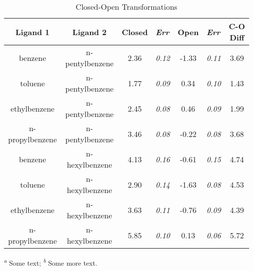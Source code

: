 \documentclass[T4paper.tex]{subfiles}
\begin{document}
\begin{table}[!htb]
\centering
\caption{Closed-Open Transformations}
\label{tbl:C-O}
\begin{tabular}{|c|c|c|l|c|l|c|}
\hline
\textbf{Ligand 1}                       & \textbf{Ligand 2}                       & {\color[HTML]{800080} \textbf{Closed}} & {\color[HTML]{800080} \textit{Err}} & {\color[HTML]{008000} \textbf{Open}} & {\color[HTML]{008000} \textit{Err}} & \textbf{C-O Diff}            \\ \hline
\cellcolor[HTML]{800080}benzene         & \cellcolor[HTML]{008000}n-pentylbenzene & 2.36                                   & \textit{0.12}                       & -1.33                                & \textit{0.11}                       & \cellcolor[HTML]{FFCCC9}3.69 \\ \hline
\cellcolor[HTML]{800080}toluene         & \cellcolor[HTML]{008000}n-pentylbenzene & 1.77                                   & \textit{0.09}                       & 0.34                                 & \textit{0.10}                       & \cellcolor[HTML]{FFCCC9}1.43 \\ \hline
\cellcolor[HTML]{800080}ethylbenzene    & \cellcolor[HTML]{008000}n-pentylbenzene & 2.45                                   & \textit{0.08}                       & 0.46                                 & \textit{0.09}                       & \cellcolor[HTML]{FFCCC9}1.99 \\ \hline
\cellcolor[HTML]{800080}n-propylbenzene & \cellcolor[HTML]{008000}n-pentylbenzene & 3.46                                   & \textit{0.08}                       & -0.22                                & \textit{0.08}                       & \cellcolor[HTML]{FFCCC9}3.68 \\ \hline
\cellcolor[HTML]{800080}benzene         & \cellcolor[HTML]{008000}n-hexylbenzene  & 4.13                                   & \textit{0.16}                       & -0.61                                & \textit{0.15}                       & \cellcolor[HTML]{FFCCC9}4.74 \\ \hline
\cellcolor[HTML]{800080}toluene         & \cellcolor[HTML]{008000}n-hexylbenzene  & 2.90                                   & \textit{0.14}                       & -1.63                                & \textit{0.08}                       & \cellcolor[HTML]{FFCCC9}4.53 \\ \hline
\cellcolor[HTML]{800080}ethylbenzene    & \cellcolor[HTML]{008000}n-hexylbenzene  & 3.63                                   & \textit{0.11}                       & -0.76                                & \textit{0.09}                       & \cellcolor[HTML]{FFCCC9}4.39 \\ \hline
\cellcolor[HTML]{800080}n-propylbenzene & \cellcolor[HTML]{008000}n-hexylbenzene  & 5.85                                   & \textit{0.10}                       & 0.13                                 & \textit{0.06}                       & \cellcolor[HTML]{FFCCC9}5.72 \\ \hline
\end{tabular}

  \textsuperscript{\emph{a}} Some text;
  \textsuperscript{\emph{b}} Some more text.
\end{table}
\end{document}
